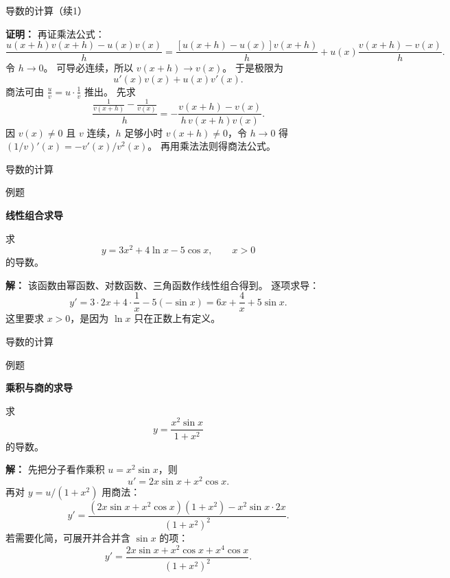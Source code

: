 \documentclass[aspectratio=169,10pt,fontset=fandol]{ctexbeamer}
\newenvironment{warning}{\par\noindent\textbf{注：}\quad}{\par\vspace{0.8em}}
\begin{document}
\begin{frame}[t,fragile]{导数的计算（续1）}
\normalsize
{\normalsize
\textbf{证明：}
再证乘法公式：
\[
\frac{u(x+h)v(x+h)-u(x)v(x)}{h}
=\frac{[u(x+h)-u(x)]v(x+h)}{h}+u(x)\frac{v(x+h)-v(x)}{h}.
\]
令 $h\to0$。 可导必连续，所以 $v(x+h)\to v(x)$。 于是极限为
\[
u'(x)v(x)+u(x)v'(x).
\]
商法可由 $\frac{u}{v}=u\cdot\frac1v$ 推出。 先求
\[
\frac{\frac1{v(x+h)}-\frac1{v(x)}}{h}
=-\frac{v(x+h)-v(x)}{h\,v(x+h)v(x)}.
\]
因 $v(x)\neq0$ 且 $v$ 连续，$h$ 足够小时 $v(x+h)\neq0$，令 $h\to0$ 得 $(1/v)'(x)=-v'(x)/v^2(x)$。 再用乘法法则得商法公式。

}
\end{frame}
\begin{frame}[t,fragile]{导数的计算}
\normalsize
\begin{block}{例题}
{\normalsize
\textbf{线性组合求导}\par

求
\[
y=3x^2+4\ln x-5\cos x,\qquad x>0
\]
的导数。

}
\end{block}
\pause
{\normalsize
\textbf{解：}
该函数由幂函数、对数函数、三角函数作线性组合得到。 逐项求导：
\[
y'=3\cdot 2x+4\cdot\frac1x-5(-\sin x)
=6x+\frac4x+5\sin x.
\]
这里要求 $x>0$，是因为 $\ln x$ 只在正数上有定义。

}
\end{frame}
\begin{frame}[t,fragile]{导数的计算}
\small
\begin{block}{例题}
{\small
\textbf{乘积与商的求导}\par

求
\[
y=\frac{x^2\sin x}{1+x^2}
\]
的导数。

}
\end{block}
\pause
{\small
\textbf{解：}
先把分子看作乘积 $u=x^2\sin x$，则
\[
u'=2x\sin x+x^2\cos x.
\]
再对 $y=u/(1+x^2)$ 用商法：
\[
y'=\frac{(2x\sin x+x^2\cos x)(1+x^2)-x^2\sin x\cdot2x}{(1+x^2)^2}.
\]
若需要化简，可展开并合并含 $\sin x$ 的项：
\[
y'=\frac{2x\sin x+x^2\cos x+x^4\cos x}{(1+x^2)^2}.
\]

}
\end{frame}
\end{document}
